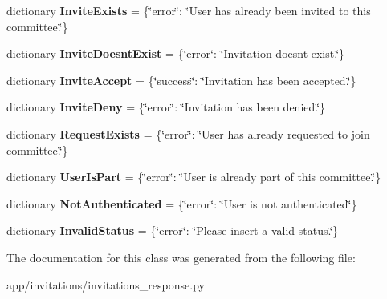 \begin{DoxyCompactItemize}
dictionary {\bfseries Invite\+Exists} = \{\char`\"{}error\char`\"{}\+: \char`\"{}User has already been invited to this committee.\char`\"{}\}
\item 
\mbox{\label{classapp_1_1invitations_1_1invitations__response_1_1_response_a2dfa1dd2a83c4b075e133b591463c15a}} 
dictionary {\bfseries Invite\+Doesnt\+Exist} = \{\char`\"{}error\char`\"{}\+: \char`\"{}Invitation doesn\textquotesingle{}t exist.\char`\"{}\}
\item 
\mbox{\label{classapp_1_1invitations_1_1invitations__response_1_1_response_a16ebb15b3c0d7c3eadb0d4346e5443af}} 
dictionary {\bfseries Invite\+Accept} = \{\char`\"{}success\char`\"{}\+: \char`\"{}Invitation has been accepted.\char`\"{}\}
\item 
\mbox{\label{classapp_1_1invitations_1_1invitations__response_1_1_response_a4f9c78448257a083cb1f447653c45abe}} 
dictionary {\bfseries Invite\+Deny} = \{\char`\"{}error\char`\"{}\+: \char`\"{}Invitation has been denied.\char`\"{}\}
\item 
\mbox{\label{classapp_1_1invitations_1_1invitations__response_1_1_response_ab55aaffb9f73c0e4fd9c86510e93e2d0}} 
dictionary {\bfseries Request\+Exists} = \{\char`\"{}error\char`\"{}\+: \char`\"{}User has already requested to join committee.\char`\"{}\}
\item 
\mbox{\label{classapp_1_1invitations_1_1invitations__response_1_1_response_a7c83d207fb8b858e474fa3ee25e9cfc4}} 
dictionary {\bfseries User\+Is\+Part} = \{\char`\"{}error\char`\"{}\+: \char`\"{}User is already part of this committee.\char`\"{}\}
\item 
\mbox{\label{classapp_1_1invitations_1_1invitations__response_1_1_response_aad7cd3bb01c2b63a0f4b97dc53cc47a5}} 
dictionary {\bfseries Not\+Authenticated} = \{\char`\"{}error\char`\"{}\+: \char`\"{}User is not authenticated\char`\"{}\}
\item 
\mbox{\label{classapp_1_1invitations_1_1invitations__response_1_1_response_a29bc5a0f2c397b5879312c32c40e3c63}} 
dictionary {\bfseries Invalid\+Status} = \{\char`\"{}error\char`\"{}\+: \char`\"{}Please insert a valid status.\char`\"{}\}
\end{DoxyCompactItemize}


The documentation for this class was generated from the following file\+:\begin{DoxyCompactItemize}
\item 
app/invitations/invitations\+\_\+response.\+py\end{DoxyCompactItemize}

